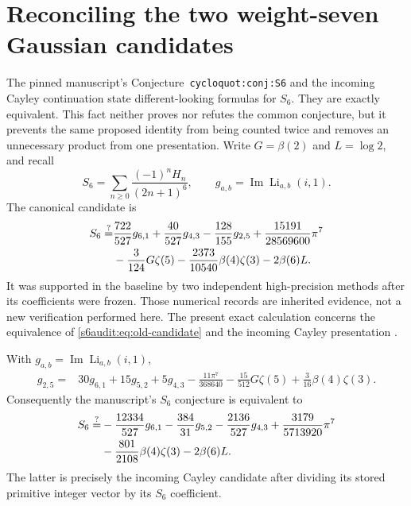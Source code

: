 \section{Reconciling the two weight-seven Gaussian candidates}
\label{s6audit:sec:main}

The pinned manuscript's Conjecture~\texttt{cycloquot:conj:S6} and the
incoming Cayley continuation state different-looking formulas for $S_6$.
They are exactly equivalent. This fact neither proves nor refutes the
common conjecture, but it prevents the same proposed identity from being
counted twice and removes an unnecessary product from one presentation.
Write $G=\beta(2)$ and $L=\log2$, and recall
\[
 S_6=\sum_{n\ge0}\frac{(-1)^nH_n}{(2n+1)^6},
 \qquad g_{a,b}=\operatorname{Im}\operatorname{Li}_{a,b}(i,1).
\]
The canonical candidate is
\begin{align}
 S_6\stackrel{?}{=}&\frac{722}{527}g_{6,1}
 +\frac{40}{527}g_{4,3}-\frac{128}{155}g_{2,5}
 +\frac{15191}{28569600}\pi^7\notag\\
 &-\frac3{124}G\zeta(5)-\frac{2373}{10540}\beta(4)\zeta(3)
 -2\beta(6)L.\label{s6audit:eq:old-candidate}
\end{align}
It was supported in the baseline by two independent high-precision
methods after its coefficients were frozen. Those numerical records
are inherited evidence, not a new verification performed here.
The present exact calculation concerns the equivalence of
\eqref{s6audit:eq:old-candidate} and the incoming Cayley presentation
\cite{cont:CayleyIncoming}.

\begin{proposition}\label{s6audit:prop:coordinate}
With $g_{a,b}=\operatorname{Im}\operatorname{Li}_{a,b}(i,1)$,
\begin{align}
 g_{2,5}={}&30g_{6,1}+15g_{5,2}+5g_{4,3}
 -\frac{11\pi^7}{368640}
 -\frac{15}{512}G\zeta(5)
 +\frac3{16}\beta(4)\zeta(3).
 \label{s6audit:eq:coordinate}
\end{align}
Consequently the manuscript's $S_6$ conjecture is equivalent to
\begin{align}
 S_6\stackrel{?}{=}&-\frac{12334}{527}g_{6,1}
        -\frac{384}{31}g_{5,2}
        -\frac{2136}{527}g_{4,3}
        +\frac{3179}{5713920}\pi^7\notag\\
       &-\frac{801}{2108}\beta(4)\zeta(3)
        -2\beta(6)L.
 \label{s6audit:eq:reduced-candidate}
\end{align}
The latter is precisely the incoming Cayley candidate after dividing its
stored primitive integer vector by its $S_6$ coefficient.
\end{proposition}

